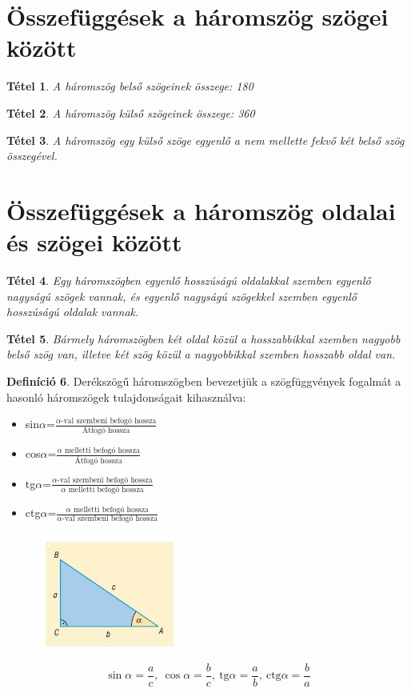 \documentclass[twoside,12pt]{report}
\newtheorem{theorem}{Tétel}[section]
\theoremstyle{definition}
\newtheorem{definition}[theorem]{Definíció}
\begin{document}
\section{Összefüggések a háromszög szögei között}
	\begin{theorem}
		A háromszög belső szögeinek összege: 180\degree
	\end{theorem}
	\begin{theorem}
		A háromszög külső szögeinek összege: 360\degree
	\end{theorem}
	\begin{theorem}
		A háromszög egy külső szöge egyenlő a nem mellette fekvő két belső szög összegével.
	\end{theorem}
\section{Összefüggések a háromszög oldalai és szögei között}
	\begin{theorem}
		Egy háromszögben egyenlő hosszúságú oldalakkal szemben egyenlő nagyságú szögek vannak,
		és egyenlő nagyságú szögekkel szemben egyenlő hosszúságú oldalak vannak.
	\end{theorem}
	\begin{theorem}
		Bármely háromszögben két oldal közül a hosszabbikkal szemben nagyobb belső szög van, illetve két szög közül a nagyobbikkal szemben hosszabb oldal van.
	\end{theorem}
\pagebreak
	\begin{definition}
		Derékszögű háromszögben bevezetjük a szögfüggvények fogalmát a hasonló háromszögek
		tulajdonságait kihasználva:
		\begin{itemize}
			\item sin$\alpha$=$\frac{\alpha\text{-val szembeni befogó hossza}}{\text{Átfogó hossza}}$
			\item cos$\alpha$=$\frac{\alpha\text{ melletti befogó hossza}}{\text{Átfogó hossza}}$
			\item tg$\alpha$=$\frac{\alpha\text{-val szembeni befogó hossza}}{\alpha\text{ melletti befogó hossza}}$
			\item ctg$\alpha$=$\frac{\alpha\text{ melletti befogó hossza}}{\alpha\text{-val szembeni befogó hossza}}$
		\end{itemize}
		\begin{figure}[H]
			\centering
			\includegraphics[width=0.4\linewidth]{Derékszög}
		\end{figure}
		\begin{equation*}
		\sin\alpha=\frac{a}{c},\ \cos\alpha=\frac{b}{c},\ \text{tg}\alpha=\frac{a}{b},\ \text{ctg}\alpha=\frac{b}{a}
		\end{equation*}
	\end{definition}
\end{document}
